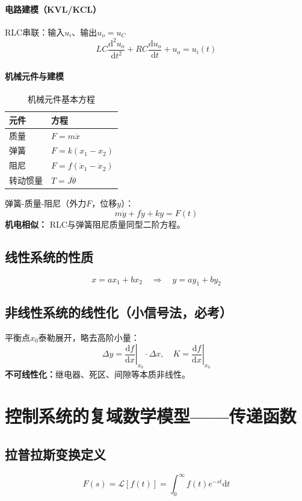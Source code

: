 \paragraph{电路建模（KVL/KCL）}
RLC串联：输入$u_i$、输出$u_o=u_C$
\[
LC\frac{\mathrm{d}^2 u_o}{\mathrm{d}t^2}+RC\frac{\mathrm{d}u_o}{\mathrm{d}t}+u_o=u_i(t)
\]

\medskip

\paragraph{机械元件与建模}
\begin{table}[htbp]
\centering
\caption{机械元件基本方程}
\begin{tabular}{ll}
\toprule
元件 & 方程 \\
\midrule
质量 & $F=m\ddot x$ \\
弹簧 & $F=k(x_1-x_2)$ \\
阻尼 & $F=f(\dot x_1-\dot x_2)$ \\
转动惯量 & $T=J\ddot\theta$ \\
\bottomrule
\end{tabular}
\end{table}

弹簧-质量-阻尼（外力$F$，位移$y$）：
\[
m\ddot y+f\dot y+ky=F(t)
\]
\noindent\textbf{机电相似：} RLC与弹簧阻尼质量同型二阶方程。

\subsection{线性系统的性质}
\[
x=ax_1+bx_2 \quad\Longrightarrow\quad y=ay_1+by_2
\]

\subsection{非线性系统的线性化（小信号法，必考）}
平衡点$x_0$泰勒展开，略去高阶小量：
\[
\Delta y=\left.\frac{\mathrm{d}f}{\mathrm{d}x}\right|_{x_0}\cdot\Delta x,\quad K=\left.\frac{\mathrm{d}f}{\mathrm{d}x}\right|_{x_0}
\]
\textbf{不可线性化：}继电器、死区、间隙等本质非线性。

\bigskip

\section{控制系统的复域数学模型——传递函数}
\subsection{拉普拉斯变换定义}
\[
F(s)=\mathcal{L}[f(t)]=\int_0^\infty f(t)e^{-st}\mathrm{d}t
\]

